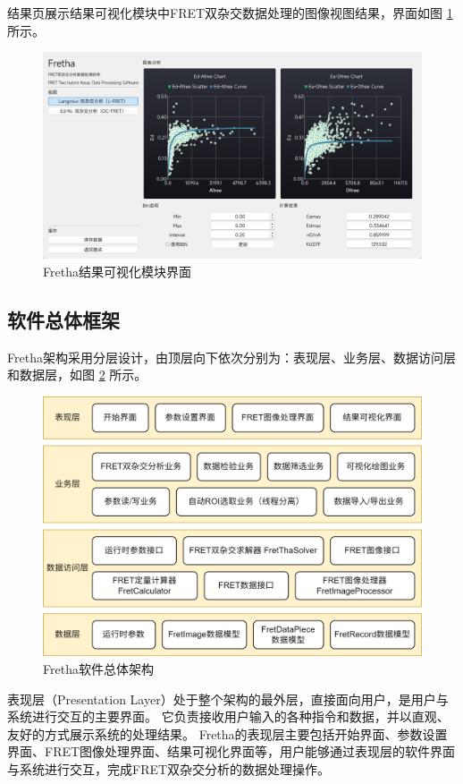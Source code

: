 结果页展示结果可视化模块中FRET双杂交数据处理的图像视图结果，界面如图 \ref{fig:fretha_result_ui} 所示。
\begin{figure}[hbtp]
  \centering
  \includegraphics[width=0.9\linewidth]{../figures/2/2_结果可视化.png}
  \caption{Fretha结果可视化模块界面}
  \label{fig:fretha_result_ui}
\end{figure}

\subsection{软件总体框架}

Fretha架构采用分层设计，由顶层向下依次分别为：表现层、业务层、数据访问层和数据层，如图 \ref{fig:fretha_arch} 所示。

\begin{figure}[hbtp]
    \centering
    \includegraphics[width=0.9\linewidth]{../figures/2/2_Fretha架构.png}
    \caption{Fretha软件总体架构}
    \label{fig:fretha_arch}
\end{figure}

表现层（Presentation Layer）处于整个架构的最外层，直接面向用户，是用户与系统进行交互的主要界面。
它负责接收用户输入的各种指令和数据，并以直观、友好的方式展示系统的处理结果。
Fretha的表现层主要包括开始界面、参数设置界面、FRET图像处理界面、结果可视化界面等，用户能够通过表现层的软件界面与系统进行交互，完成FRET双杂交分析的数据处理操作。

